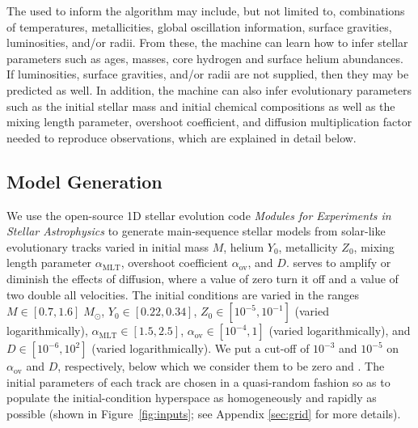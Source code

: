 The  used to inform the algorithm may include, but  not limited to, combinations of temperatures, metallicities, global oscillation information, surface gravities, luminosities, and/or radii. From these, the machine can learn how to infer stellar parameters such as ages, masses, core hydrogen and surface helium abundances. If luminosities, surface gravities, and/or radii are not supplied, then they may be predicted as well. In addition, the machine can also infer evolutionary parameters such as the initial stellar mass and initial chemical compositions as well as the mixing length parameter, overshoot coefficient, and diffusion multiplication factor needed to reproduce observations, which are explained in detail below. 

\subsection{Model Generation}
\label{sec:models}
We use the open-source 1D stellar evolution code \emph{Modules for Experiments in Stellar Astrophysics} \citep[MESA;][]{2011apjs..192....3p} to generate main-sequence stellar models from solar-like evolutionary tracks varied in initial mass $M$, helium $Y_0$, metallicity $Z_0$, mixing length parameter $\alpha_{\text{MLT}}$, overshoot coefficient $\alpha_{\text{ov}}$, and  $D$.  serves to amplify or diminish the effects of diffusion, where a value of zero turn it off and a value of two double all velocities. The initial conditions are varied in the ranges ${M\in [0.7, 1.6]\;M_\odot}$, ${Y_0\in [0.22, 0.34]}$, ${Z_0\in [10^{-5}, 10^{-1}]}$ (varied logarithmically), ${\alpha_{\text{MLT}}\in [1.5, 2.5]}$, ${\alpha_{\text{ov}}\in [10^{-4}, 1]}$ (varied logarithmically), and ${D\in [10^{-6}, 10^2]}$ (varied logarithmically). We put a cut-off of $10^{-3}$ and $10^{-5}$ on $\alpha_{\text{ov}}$ and $D$, respectively, below which we consider them to be zero and . The initial parameters of each track are chosen in a quasi-random fashion so as to populate the initial-condition hyperspace as homogeneously and rapidly as possible (shown in Figure~\ref{fig:inputs}; see Appendix \ref{sec:grid} for more details). 

